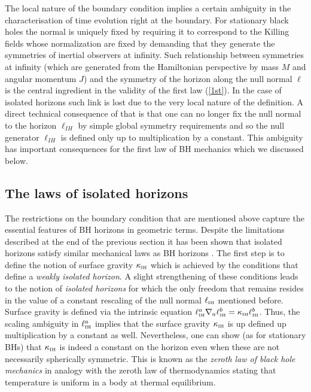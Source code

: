 \documentclass[aps, nofootinbib,superscriptaddress,12pt]{revtex4-2}
\newcommand{\va}{\scriptscriptstyle}
\begin{document}
The local nature of the boundary condition implies a certain ambiguity in the characterisation of time evolution right at the boundary. For stationary black holes the normal is uniquely fixed by requiring it to correspond to the Killing fields whose normalization are fixed by demanding that they generate the symmetries of inertial observers at infinity. Such relationship between symmetries at infinity (which are generated from the Hamiltonian perspective by mass $M$ and angular momentum $J$) and the symmetry of the horizon along the null normal $\ell$ is the central ingredient in the validity of the first law (\ref{1st}). In the case of isolated horizons such link is lost due to the very local nature of the definition. 
A direct technical consequence of that is that one can no longer fix the null normal to the horizon $\ell_{\va IH}$ by simple global symmetry requirements and so  the  null generator $\ell_{\va IH}$ is defined only up to multiplication by a constant. 
This ambiguity has important consequences for the first law of BH mechanics which we discussed below.

\subsection{The laws of isolated horizons}\label{lih}

The restrictions on the boundary condition that are mentioned above capture the essential features of BH horizons in geometric terms. Despite the limitations described at the end of the previous section it has been shown that isolated horizons satisfy similar mechanical laws as BH horizons \cite{Ashtekar:1998sp, Ashtekar:1999yj, Ashtekar:2001is, Ashtekar:2001jb}. The first step is to define the notion of surface gravity $\kappa_{\va \rm IH}$ which is achieved by the conditions that define a  {\em weakly isolated horizon}.  A slight strengthening of these conditions leads to the notion of {\em isolated horizons} for which the only freedom that remains resides in the value of a constant rescaling of the null normal $\ell_{\va \rm IH}$ mentioned before. Surface gravity is defined via the intrinsic equation $\ell^a_{\va \rm IH}\nabla_a \ell_{\va\rm  IH}^b=\kappa_{\va\rm  IH} \ell_{\va \rm IH}^b$. Thus, the scaling ambiguity in  $\ell^a_{\va \rm{IH}}$ implies that the surface gravity $\kappa_{\va\rm IH}$ is up defined up multiplication by a constant as well. Nevertheless, one can show (as for stationary BHs) that $\kappa_{\va \rm IH}$ is indeed a constant on the horizon even when these are not necessarily spherically symmetric. This is known as the {\em zeroth law of black hole mechanics} in analogy with the zeroth law of thermodynamics stating that temperature is uniform in a body at thermal equilibrium. 
\end{document}
